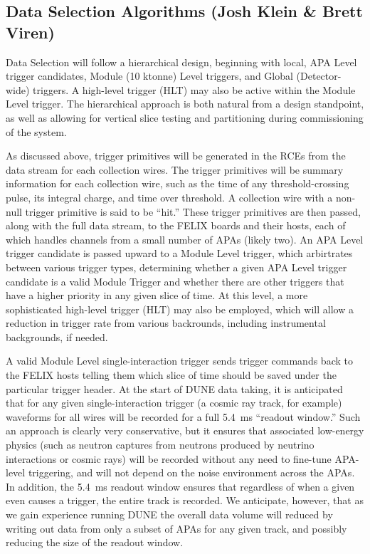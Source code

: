 \subsection{Data Selection Algorithms (Josh Klein \& Brett Viren)}
\label{sec:fdsp-daq-sel}


	Data Selection will follow a hierarchical design, beginning with local,
APA Level trigger candidates, Module (10 ktonne) Level triggers, and Global
(Detector-wide) triggers. A high-level trigger (HLT) may also be active within
the Module Level trigger.  The hierarchical approach is both natural from a
design standpoint, as well as allowing for vertical slice testing and
partitioning during commissioning of the system.

	As discussed above, trigger primitives will be generated in the RCEs
from the data stream for each collection wires.  The trigger primitives will be
summary information for each collection wire, such as the time of any
threshold-crossing pulse, its integral charge, and time over threshold.  A
collection wire with a non-null trigger primitive is said to be ``hit.''  These
trigger primitives are then passed, along with the full data stream, to the
FELIX boards and their hosts, each of which handles channels from a small
number of APAs (likely two).  An APA Level trigger candidate is passed upward to
a Module Level trigger, which arbirtrates between various trigger types,
determining whether a given APA Level trigger candidate is a valid Module
Trigger and whether there are other triggers that have a higher priority in any
given slice of time.  At this level, a more sophisticated high-level trigger
(HLT) may also be employed, which will allow a reduction in trigger rate from
various backrounds, including instrumental backgrounds, if needed. 

	A valid Module Level single-interaction trigger sends trigger commands
back to the FELIX hosts telling them which slice of time should be saved under
the particular trigger header.  At the start of DUNE data taking, it is
anticipated that for any given single-interaction trigger (a cosmic ray track,
for example) waveforms for all wires will be recorded for a full 5.4~ms
``readout window.'' Such an approach is clearly very conservative, but it
ensures that associated low-energy physics (such as neutron captures from
neutrons produced by neutrino interactions or cosmic rays) will be recorded
without any need to fine-tune APA-level triggering, and will not depend on
the noise environment across the APAs. In addition, the 5.4~ms readout window
ensures that regardless of when a given even causes a trigger, the entire track
is recorded.  We anticipate, however, that as we gain experience running DUNE
the overall data volume will reduced by writing out data from only a
subset of APAs for any given track, and possibly reducing the size of the
readout window.

